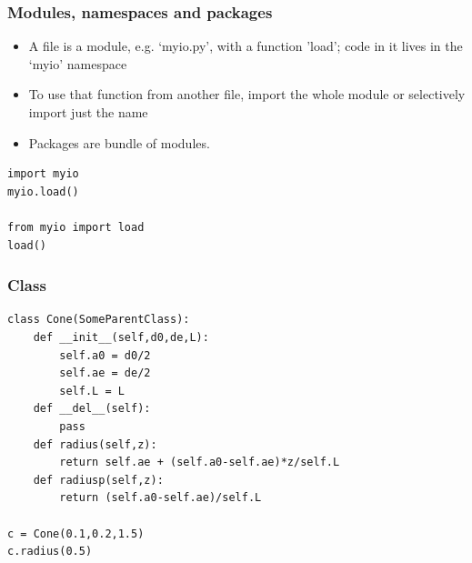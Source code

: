 

\begin{frame}[fragile]\frametitle{Modules, namespaces and packages}
  \begin{itemize}
  \item A file is a module, e.g. `myio.py', with a function 'load'; code in it lives in the `myio' namespace
  \item To use that function from another file, import the whole module or selectively import just the name
  \item  Packages are bundle of modules.
  \end{itemize}
  \begin{lstlisting}
import myio
myio.load()

from myio import load
load()
  \end{lstlisting}
\end{frame}


\begin{frame}[fragile]\frametitle{Class}
  \begin{lstlisting}
class Cone(SomeParentClass):
	def __init__(self,d0,de,L):
		self.a0 = d0/2
		self.ae = de/2
		self.L = L
	def __del__(self):
		pass
	def radius(self,z):
		return self.ae + (self.a0-self.ae)*z/self.L
	def radiusp(self,z):
		return (self.a0-self.ae)/self.L

c = Cone(0.1,0.2,1.5)
c.radius(0.5)
  \end{lstlisting}

\end{frame}


